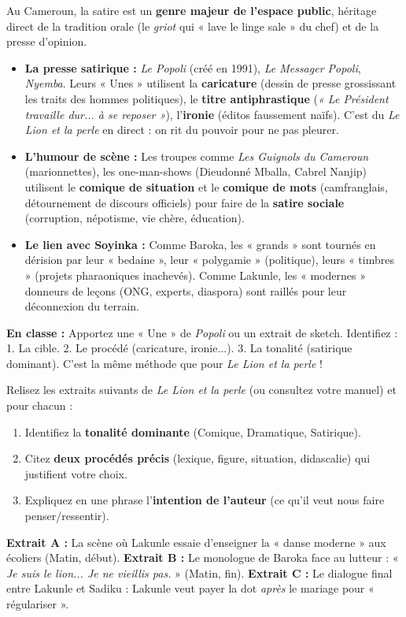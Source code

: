 \documentclass[11pt]{article}
\begin{document}
\begin{savaistu}
Au Cameroun, la satire est un \textbf{genre majeur de l'espace public}, héritage direct de la tradition orale (le \emph{griot} qui « lave le linge sale » du chef) et de la presse d'opinion.
\begin{itemize}
    \item \textbf{La presse satirique :} \emph{Le Popoli} (créé en 1991), \emph{Le Messager Popoli}, \emph{Nyemba}. Leurs « Unes » utilisent la \textbf{caricature} (dessin de presse grossissant les traits des hommes politiques), le \textbf{titre antiphrastique} (\emph{« Le Président travaille dur... à se reposer »}), l'\textbf{ironie} (éditos faussement naïfs). C'est du \emph{Le Lion et la perle} en direct : on rit du pouvoir pour ne pas pleurer.
    \item \textbf{L'humour de scène :} Les troupes comme \emph{Les Guignols du Cameroun} (marionnettes), les one-man-shows (Dieudonné Mballa, Cabrel Nanjip) utilisent le \textbf{comique de situation} et le \textbf{comique de mots} (camfranglais, détournement de discours officiels) pour faire de la \textbf{satire sociale} (corruption, népotisme, vie chère, éducation).
    \item \textbf{Le lien avec Soyinka :} Comme Baroka, les « grands » sont tournés en dérision par leur « bedaine », leur « polygamie » (politique), leurs « timbres » (projets pharaoniques inachevés). Comme Lakunle, les « modernes » donneurs de leçons (ONG, experts, diaspora) sont raillés pour leur déconnexion du terrain.
\end{itemize}
\textbf{En classe :} Apportez une « Une » de \emph{Popoli} ou un extrait de sketch. Identifiez : 1. La cible. 2. Le procédé (caricature, ironie...). 3. La tonalité (satirique dominant). C'est la même méthode que pour \emph{Le Lion et la perle} !
\end{savaistu}

\begin{exercice}
Relisez les extraits suivants de \emph{Le Lion et la perle} (ou consultez votre manuel) et pour chacun :
\begin{enumerate}
    \item Identifiez la \textbf{tonalité dominante} (Comique, Dramatique, Satirique).
    \item Citez \textbf{deux procédés précis} (lexique, figure, situation, didascalie) qui justifient votre choix.
    \item Expliquez en une phrase l'\textbf{intention de l'auteur} (ce qu'il veut nous faire penser/ressentir).
\end{enumerate}
\textbf{Extrait A :} La scène où Lakunle essaie d'enseigner la « danse moderne » aux écoliers (Matin, début).
\textbf{Extrait B :} Le monologue de Baroka face au lutteur : « \emph{Je suis le lion... Je ne vieillis pas.} » (Matin, fin).
\textbf{Extrait C :} Le dialogue final entre Lakunle et Sadiku : Lakunle veut payer la dot \emph{après} le mariage pour « régulariser ».
\end{exercice}
\end{document}
